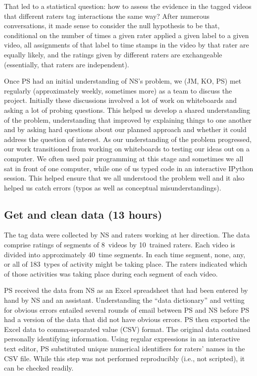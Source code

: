 \documentclass[]{article}
\begin{document}
That led to a statistical question: how to assess the evidence in the tagged videos
that different raters
tag interactions the same way? 
After numerous conversations, it made sense to consider the null hypothesis to be
that, conditional on the number of times a given rater applied a given label to
a given video, all assignments of that label to time stamps in the video by that
rater are equally
likely, and the ratings given by different raters are exchangeable (essentially, that
raters are independent).

Once PS had an initial understanding of NS's problem, we (JM, KO, PS) met
regularly (approximately weekly, sometimes more) as a team to discuss the
project.
Initially these discussions involved a lot of work on whiteboards and asking a
lot of probing questions.
This helped us develop a shared understanding of the problem, understanding
that improved by explaining things to one
another and by asking hard questions about our planned approach and whether
it could address the question of interest.
As our understanding of the problem progressed, our work transitioned from
working on whiteboards to testing our ideas out on a computer.
We often used pair programming at this stage and sometimes we
all sat in front of one computer, while one of us typed code in an interactive
IPython session.
This helped ensure that we all understood the problem well and it also helped
us catch errors (typos as well as conceptual misunderstandings).

\subsection{Get and clean data (13 hours)}

The tag data were collected by NS and raters working at her direction.
The data comprise ratings of segments of 8~videos by 10~trained raters.
Each video is divided into approximately 40~time segments.
In each time segment, none, any, or all of 183~types of activity might be
taking place.
The raters indicated which of those activities was taking place during each
segment of each video.

PS received the data from NS as an Excel spreadsheet that had been entered
by hand by NS and an assistant.
Understanding the ``data dictionary'' and vetting for obvious errors entailed
several rounds of email between PS and NS before PS had a version of the data
that did not have obvious errors.
PS then exported the Excel data to comma-separated value (CSV) format.
The original data contained personally identifying information.
Using regular expressions in an interactive text editor, PS substituted
unique numerical identifiers for raters' names in the CSV file.
While this step was not performed reproducibly (i.e., not scripted), it can be
checked readily.
\end{document}
